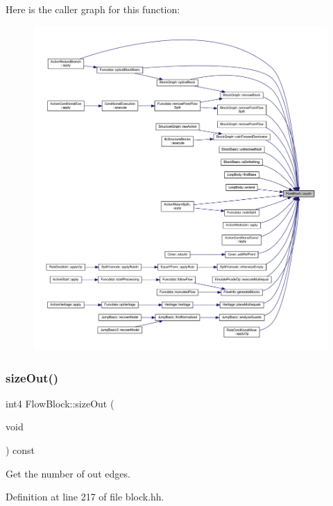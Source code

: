 Here is the caller graph for this function\+:
\nopagebreak
\begin{figure}[H]
\begin{center}
\leavevmode
\includegraphics[width=350pt]{class_flow_block_aab379442c099264f10c1f1f3b9ecf5fe_icgraph}
\end{center}
\end{figure}
\mbox{\label{class_flow_block_abf4424ddc9e448fcd52e72ebe9fb8a2b}} 
\subsubsection{\texorpdfstring{sizeOut()}{sizeOut()}}
{\footnotesize\ttfamily int4 Flow\+Block\+::size\+Out (\begin{DoxyParamCaption}\item[{void}]{ }\end{DoxyParamCaption}) const\hspace{0.3cm}{\ttfamily [inline]}}



Get the number of out edges. 



Definition at line 217 of file block.\+hh.

